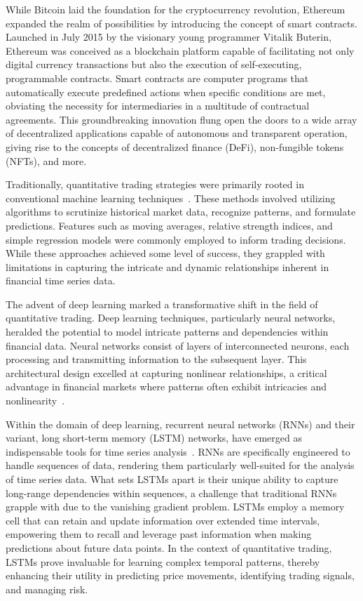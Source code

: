 \documentclass[10pt,twocolumn,letterpaper]{article}
\begin{document}
While Bitcoin laid the foundation for the cryptocurrency revolution, Ethereum expanded the realm of possibilities by introducing the concept of smart contracts. Launched in July 2015 by the visionary young programmer Vitalik Buterin, Ethereum was conceived as a blockchain platform capable of facilitating not only digital currency transactions but also the execution of self-executing, programmable contracts. Smart contracts are computer programs that automatically execute predefined actions when specific conditions are met, obviating the necessity for intermediaries in a multitude of contractual agreements. This groundbreaking innovation flung open the doors to a wide array of decentralized applications capable of autonomous and transparent operation, giving rise to the concepts of decentralized finance (DeFi), non-fungible tokens (NFTs), and more.

Traditionally, quantitative trading strategies were primarily rooted in conventional machine learning techniques~\cite{Szegedy15}. These methods involved utilizing algorithms to scrutinize historical market data, recognize patterns, and formulate predictions. Features such as moving averages, relative strength indices, and simple regression models were commonly employed to inform trading decisions. While these approaches achieved some level of success, they grappled with limitations in capturing the intricate and dynamic relationships inherent in financial time series data.

The advent of deep learning marked a transformative shift in the field of quantitative trading. Deep learning techniques, particularly neural networks, heralded the potential to model intricate patterns and dependencies within financial data. Neural networks consist of layers of interconnected neurons, each processing and transmitting information to the subsequent layer. This architectural design excelled at capturing nonlinear relationships, a critical advantage in financial markets where patterns often exhibit intricacies and nonlinearity~\cite{Szegedy15}.

Within the domain of deep learning, recurrent neural networks (RNNs) and their variant, long short-term memory (LSTM) networks, have emerged as indispensable tools for time series analysis~\cite{FuzzyInferenceLSTM}. RNNs are specifically engineered to handle sequences of data, rendering them particularly well-suited for the analysis of time series data. What sets LSTMs apart is their unique ability to capture long-range dependencies within sequences, a challenge that traditional RNNs grapple with due to the vanishing gradient problem. LSTMs employ a memory cell that can retain and update information over extended time intervals, empowering them to recall and leverage past information when making predictions about future data points. In the context of quantitative trading, LSTMs prove invaluable for learning complex temporal patterns, thereby enhancing their utility in predicting price movements, identifying trading signals, and managing risk.
\end{document}
